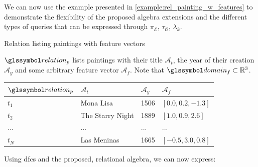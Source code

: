 We can now use the example presented in \cref{example:rel_painting_w_features} to demonstrate the flexibility of the proposed algebra extensions and the different types of queries that can be expressed through $\pi_{\mathcal{E}}$, $\tau_{\mathcal{O}}$, $\lambda_k$.

\begin{example}[label=example:rel_painting_w_features]{Relation listing paintings with feature vectors}{}
    
    $\relation_{p}$ lists paintings with their title $\mathcal{A}_{t}$, the year of their creation $\mathcal{A}_{y}$ and some arbitrary feature vector $\mathcal{A}_{f}$. Note that $\domain_{f} \subset \mathbb{R}^{3}$.
        
    \begin{center}
        \begin{tabular}{ l || l | l | l |}
            $\relation_{p}$ & $\mathcal{A}_{t}$  & $\mathcal{A}_{y}$  & $\mathcal{A}_{f}$ \\ 
            \hline
            \hline
            $t_1$ & Mona Lisa & 1506 & $\left\lbrack 0.0, 0.2, -1.3 \right\rbrack$ \\
            \hline
            $t_2$ & The Starry Night & 1889 & $\left\lbrack 1.0, 0.9, 2.6 \right\rbrack$ \\
            \hline
            ... & ... & ... & ... \\
            \hline
            $t_N$ & Las Meninas & 1665 & $\left\lbrack -0.5, 3.0, 0.8 \right\rbrack$ \\
            \hline
        \end{tabular}
    \end{center}

    Using \acrshort{dfc}s and the proposed, relational algebra,  we can now express:


\end{example}
